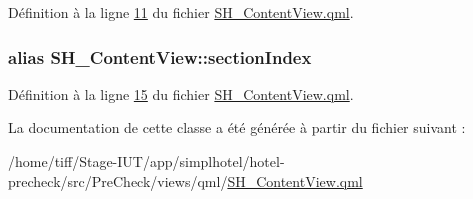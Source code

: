 Définition à la ligne \hyperlink{SH__ContentView_8qml_source_l00011}{11} du fichier \hyperlink{SH__ContentView_8qml_source}{S\-H\-\_\-\-Content\-View.\-qml}.

\hypertarget{classSH__ContentView_a554c2eaf9b48986c87fa8fb0178c0d1d}{
\subsubsection[{section\-Index}]{\setlength{\rightskip}{0pt plus 5cm}alias S\-H\-\_\-\-Content\-View\-::section\-Index}}\label{classSH__ContentView_a554c2eaf9b48986c87fa8fb0178c0d1d}


Définition à la ligne \hyperlink{SH__ContentView_8qml_source_l00015}{15} du fichier \hyperlink{SH__ContentView_8qml_source}{S\-H\-\_\-\-Content\-View.\-qml}.



La documentation de cette classe a été générée à partir du fichier suivant \-:\begin{DoxyCompactItemize}
\item 
/home/tiff/\-Stage-\/\-I\-U\-T/app/simplhotel/hotel-\/precheck/src/\-Pre\-Check/views/qml/\hyperlink{SH__ContentView_8qml}{S\-H\-\_\-\-Content\-View.\-qml}\end{DoxyCompactItemize}
